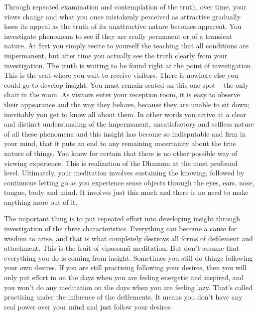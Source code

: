 Through repeated examination and contemplation of the truth, over time, your views change and what you once mistakenly perceived as attractive gradually loses its appeal as the truth of its unattractive nature becomes apparent. You investigate phenomena to see if they are really permanent or of a transient nature. At first you simply recite to yourself the teaching that all conditions are impermanent, but after time you actually see the truth clearly from your investigation. The truth is waiting to be found right at the point of investigation. This is the seat where you wait to receive visitors. There is nowhere else you could go to develop insight. You must remain seated on this one spot -- the only chair in the room. As visitors enter your reception room, it is easy to observe their appearance and the way they behave, because they are unable to sit down; inevitably you get to know all about them. In other words you arrive at a clear and distinct understanding of the impermanent, unsatisfactory and selfless nature of all these phenomena and this insight has become so indisputable and firm in your mind, that it puts an end to any remaining uncertainty about the true nature of things. You know for certain that there is no other possible way of viewing experience. This is realization of the Dhamma at the most profound level. Ultimately, your meditation involves sustaining the knowing, followed by continuous letting go as you experience sense objects through the eyes, ears, nose, tongue, body and mind. It involves just this much and there is no need to make anything more out of it.

The important thing is to put repeated effort into developing insight through investigation of the three characteristics. Everything can become a cause for wisdom to arise, and that is what completely destroys all forms of defilement and attachment. This is the fruit of vipassan\=a meditation. But don't assume that everything you do is coming from insight. Sometimes you still do things following your own desires. If you are still practising following your desires, then you will only put effort in on the days when you are feeling energetic and inspired, and you won't do any meditation on the days when you are feeling lazy. That's called practising under the influence of the defilements. It means you don't have any real power over your mind and just follow your desires.

